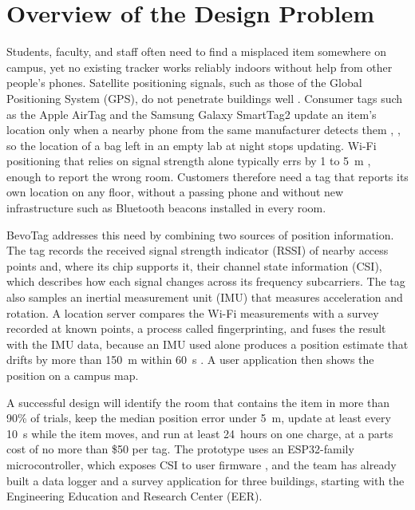 \documentclass[12pt,letterpaper]{article}
\begin{document}
\section{Overview of the Design Problem}
Students, faculty, and staff often need to find a misplaced item somewhere on campus, yet no
existing tracker works reliably indoors without help from other people's phones. Satellite
positioning signals, such as those of the Global Positioning System (GPS), do not penetrate
buildings well \cite{hechan}. Consumer tags such as the Apple AirTag and the Samsung Galaxy
SmartTag2 update an item's location only when a nearby phone from the same manufacturer detects
them \cite{airtag}, \cite{smarttag}, so the location of a bag left in an empty lab at night stops
updating. Wi-Fi
positioning that relies on signal strength alone typically errs by 1 to 5~m \cite{rssi}, enough to
report the wrong room. Customers therefore need a tag that reports its own location on any floor,
without a passing phone and without new infrastructure such as Bluetooth beacons installed in
every room.

BevoTag addresses this need by combining two sources of position information. The tag records the
received signal strength indicator (RSSI) of nearby access points and, where its chip supports it,
their channel state information (CSI), which describes how each signal changes across its frequency
subcarriers. The tag also samples an inertial measurement unit (IMU) that measures acceleration and
rotation. A location server compares the Wi-Fi measurements with a survey recorded at known points,
a process called fingerprinting, and fuses the result with the IMU data, because an IMU used alone
produces a position estimate that drifts by more than 150~m within 60~s \cite{imu}. A user
application then shows the position on a campus map.

A successful design will identify the room that contains the item in more than 90\% of trials,
keep the median position error under 5~m, update at least every 10~s while the item moves, and run
at least 24~hours on one charge, at a parts cost of no more than \$50 per tag. The prototype uses
an ESP32-family microcontroller, which exposes CSI to user firmware \cite{espcsi}, and the team has
already built a data logger and a survey application for three buildings, starting with the
Engineering Education and Research Center (EER).

\end{document}
